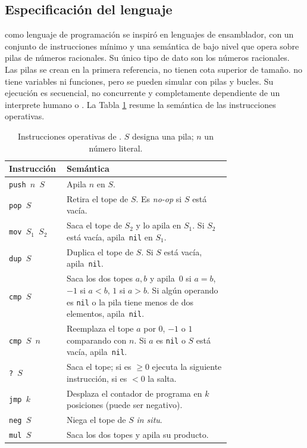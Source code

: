 \subsection{Especificaci\'on del lenguaje}
\label{sec:methodology:language}

\sculpt como lenguaje de programaci\'on se inspir\'o en lenguajes de ensamblador,
con un conjunto de instrucciones m\'inimo y una sem\'antica de bajo nivel que opera sobre pilas de n\'umeros racionales. 
Su \'unico tipo de dato son los n\'umeros racionales. Las pilas se crean en la primera referencia, no tienen
cota superior de tama\~no. \sculpt no tiene variables ni funciones, pero se pueden simular con pilas y bucles.
Su ejecuci\'on es secuencial, no concurrente y completamente dependiente de un interprete humano o \sculpter.
La Tabla \ref{tab:instructions} resume la sem\'antica de las instrucciones operativas.

\begin{table}[h]
\centering
\caption{Instrucciones operativas de \sculpt. $S$ designa una pila;
$n$ un n\'umero literal.}
\label{tab:instructions}
\begin{tabular}{@{}lp{0.74\linewidth}@{}}
\toprule
Instrucci\'on & Sem\'antica \\
\midrule
\texttt{push $n$ $S$}    & Apila $n$ en $S$. \\
\texttt{pop $S$}         & Retira el tope de $S$. Es \emph{no-op} si $S$ est\'a vac\'ia. \\
\texttt{mov $S_1$ $S_2$} & Saca el tope de $S_2$ y lo apila en $S_1$. Si $S_2$ est\'a vac\'ia, apila~\texttt{nil} en $S_1$. \\
\texttt{dup $S$}         & Duplica el tope de $S$. Si $S$ est\'a vac\'ia, apila~\texttt{nil}. \\
\texttt{cmp $S$}         & Saca los dos topes $a,b$ y apila~$0$ si $a=b$, $-1$ si $a<b$, $1$ si $a>b$. Si alg\'un operando es \texttt{nil} o la pila tiene menos de dos elementos, apila~\texttt{nil}. \\
\texttt{cmp $S$ $n$}     & Reemplaza el tope $a$ por $0$, $-1$ o $1$ comparando con $n$. Si $a$ es \texttt{nil} o $S$ est\'a vac\'ia, apila~\texttt{nil}. \\
\texttt{?\ $S$}          & Saca el tope; si es $\geq 0$ ejecuta la siguiente instrucci\'on, si es $<0$ la salta. \\
\texttt{jmp $k$}         & Desplaza el contador de programa en $k$ posiciones (puede ser negativo). \\
\texttt{neg $S$}         & Niega el tope de $S$ \emph{in situ}. \\
\texttt{mul $S$}         & Saca los dos topes y apila su producto. \\
\bottomrule
\end{tabular}
\end{table}

